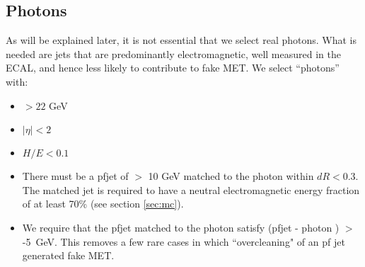 \begin{itemize}

\end{itemize}


\subsection{Photons}

As will be explained later, it is not essential that we select real photons. 
What is needed are jets that are predominantly electromagnetic, well measured in the ECAL, and hence less likely to contribute to fake MET. We select ``photons'' with:

\begin{itemize}
\item \pt $ > 22$ GeV
\item $|\eta| < 2$
\item $H/E < 0.1$
\item There must be a pfjet of \pt $ >$ 10 GeV 
matched to the photon within $dR < 0.3$. The matched jet is required to have 
a neutral electromagnetic energy fraction of at least 
70\% (see section \ref{sec:mc}).

\item 
  We require that the pfjet \pt matched to the photon satisfy (pfjet \pt - photon \pt) 
  $>$ -5~GeV. This removes a few rare cases in which ``overcleaning" of an 
  pf jet
  generated fake MET.

\end{itemize}

